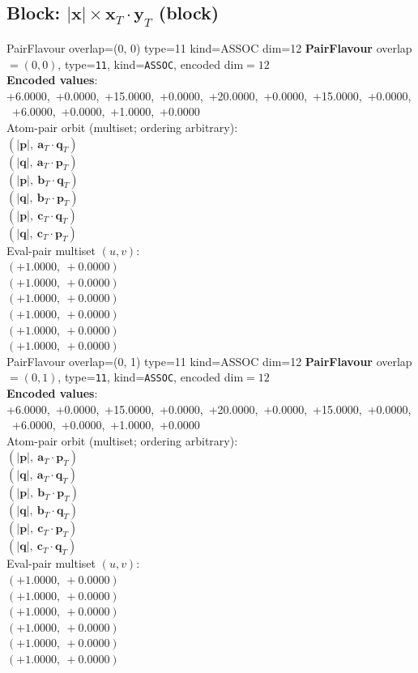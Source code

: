 \documentclass[a4paper,11pt]{article}
\newcommand{\vc}[1]{\ensuremath{\mathbf{#1}}}
\newcommand{\dnfagmiihhiejm}[1]{|\vc{#1}|}
\newcommand{\fpbeomcfokjooi}[2]{\mathbf{#1}_T \cdot \mathbf{#2}_T}
\begin{document}
\subsection{Block: $\dnfagmiihhiejm{x} \times \fpbeomcfokjooi{x}{y}$  (block)}
    PairFlavour  overlap=(0, 0)  type=11  kind=ASSOC  dim=12
\textbf{PairFlavour} overlap$=(0, 0)$, type=\texttt{11}, kind=\texttt{ASSOC}, encoded dim$=12$\\
\textbf{      Encoded values}: +6.0000,\ +0.0000,\ +15.0000,\ +0.0000,\ +20.0000,\ +0.0000,\ +15.0000,\ +0.0000,\ +6.0000,\ +0.0000,\ +1.0000,\ +0.0000\\
\quad Atom-pair orbit (multiset; ordering arbitrary):\\
$(\dnfagmiihhiejm{p},\ \fpbeomcfokjooi{a}{q})$\\
$(\dnfagmiihhiejm{q},\ \fpbeomcfokjooi{a}{p})$\\
$(\dnfagmiihhiejm{p},\ \fpbeomcfokjooi{b}{q})$\\
$(\dnfagmiihhiejm{q},\ \fpbeomcfokjooi{b}{p})$\\
$(\dnfagmiihhiejm{p},\ \fpbeomcfokjooi{c}{q})$\\
$(\dnfagmiihhiejm{q},\ \fpbeomcfokjooi{c}{p})$\\
\quad Eval-pair multiset $(u, v)$:\\
$(+1.0000,\ +0.0000)$\\
$(+1.0000,\ +0.0000)$\\
$(+1.0000,\ +0.0000)$\\
$(+1.0000,\ +0.0000)$\\
$(+1.0000,\ +0.0000)$\\
$(+1.0000,\ +0.0000)$\\
    PairFlavour  overlap=(0, 1)  type=11  kind=ASSOC  dim=12
\textbf{PairFlavour} overlap$=(0, 1)$, type=\texttt{11}, kind=\texttt{ASSOC}, encoded dim$=12$\\
\textbf{      Encoded values}: +6.0000,\ +0.0000,\ +15.0000,\ +0.0000,\ +20.0000,\ +0.0000,\ +15.0000,\ +0.0000,\ +6.0000,\ +0.0000,\ +1.0000,\ +0.0000\\
\quad Atom-pair orbit (multiset; ordering arbitrary):\\
$(\dnfagmiihhiejm{p},\ \fpbeomcfokjooi{a}{p})$\\
$(\dnfagmiihhiejm{q},\ \fpbeomcfokjooi{a}{q})$\\
$(\dnfagmiihhiejm{p},\ \fpbeomcfokjooi{b}{p})$\\
$(\dnfagmiihhiejm{q},\ \fpbeomcfokjooi{b}{q})$\\
$(\dnfagmiihhiejm{p},\ \fpbeomcfokjooi{c}{p})$\\
$(\dnfagmiihhiejm{q},\ \fpbeomcfokjooi{c}{q})$\\
\quad Eval-pair multiset $(u, v)$:\\
$(+1.0000,\ +0.0000)$\\
$(+1.0000,\ +0.0000)$\\
$(+1.0000,\ +0.0000)$\\
$(+1.0000,\ +0.0000)$\\
$(+1.0000,\ +0.0000)$\\
$(+1.0000,\ +0.0000)$\\
\end{document}
